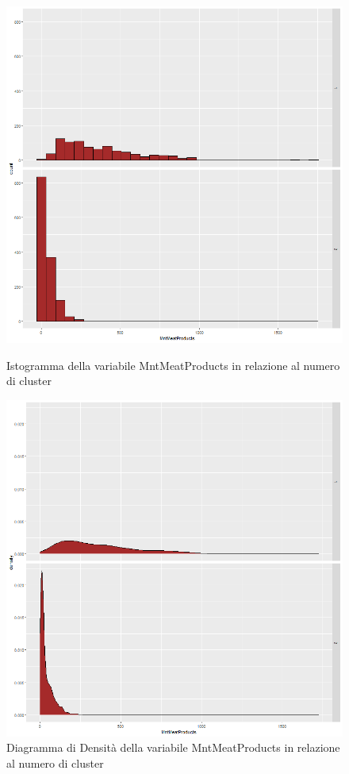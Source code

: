 \documentclass[letterpaper,11pt]{article}
\begin{document}
\begin{figure}[H]
   \begin{minipage}{0.48\textwidth}
     \centering
         \includegraphics[width=1\textwidth]{Img/K-MEANS/KMEANS019.png}
    \caption{Istogramma della variabile MntMeatProducts in relazione al numero di cluster}
    \label{fig:MntMeatProductsKmeansHistogram}
   \end{minipage}\hfill
   \begin{minipage}{0.48\textwidth}
     \centering
     \includegraphics[width=1\linewidth]{Img/K-MEANS/KMEANS020.png}
     \caption{Diagramma di Densità della variabile MntMeatProducts in relazione al numero di cluster}\label{fig:MntMeatProductsKmeansDensity}
   \end{minipage}
\end{figure}
\end{document}
